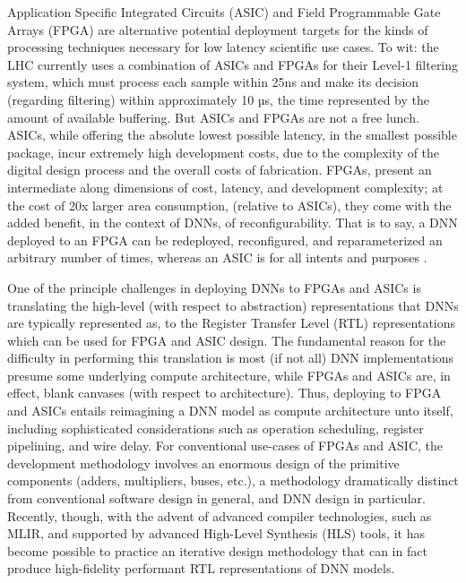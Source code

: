 Application Specific Integrated Circuits (ASIC) and Field Programmable Gate Arrays (FPGA) are alternative potential deployment targets for the kinds of processing techniques necessary for low latency scientific use cases.
To wit: the LHC currently uses a combination of ASICs and FPGAs for their Level-1 filtering system, which must process each sample within 25ns and make its decision (regarding filtering) within approximately 10 µs, the time represented by the amount of available buffering.
But ASICs and FPGAs are not a free lunch.
ASICs, while offering the absolute lowest possible latency, in the smallest possible package, incur extremely high development costs, due to the complexity of the digital design process and the overall costs of fabrication.
FPGAs, present an intermediate along dimensions of cost, latency, and development complexity; at the cost of 20x larger area consumption,  (relative to ASICs), they come with the added benefit, in the context of DNNs, of reconfigurability.
That is to say, a DNN deployed to an FPGA can be redeployed, reconfigured, and reparameterized an arbitrary number of times, whereas an ASIC is for all intents and purposes .

One of the principle challenges in deploying DNNs to FPGAs and ASICs is translating the high-level (with respect to abstraction) representations that DNNs are typically represented as, to the Register Transfer Level (RTL) representations which can be used for FPGA and ASIC design.
The fundamental reason for the difficulty in performing this translation is most (if not all) DNN implementations presume some underlying compute architecture, while FPGAs and ASICs are, in effect, blank canvases (with respect to architecture).
Thus, deploying to FPGA and ASICs entails reimagining a DNN model as compute architecture unto itself, including sophisticated considerations such as operation scheduling, register pipelining, and wire delay.
For conventional use-cases of FPGAs and ASIC, the development methodology involves an enormous  design of the primitive components (adders, multipliers, buses, etc.), a methodology dramatically distinct from conventional software design in general, and DNN design in particular.
Recently, though, with the advent of advanced compiler technologies, such as MLIR, and supported by advanced High-Level Synthesis (HLS) tools, it has become possible to practice an iterative design methodology that can in fact produce high-fidelity performant RTL representations of DNN models.


